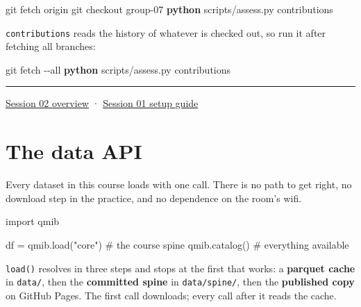 \documentclass[
  letterpaper,
  10pt,
  twoside,
  openright,
  numbers=noenddot,
  chapterprefix=true]{scrbook}
\newenvironment{Shaded}{}{}
\newcommand{\AttributeTok}[1]{\textcolor[rgb]{0.84,0.23,0.29}{#1}}
\newcommand{\CommentTok}[1]{\textcolor[rgb]{0.42,0.45,0.49}{#1}}
\newcommand{\ExtensionTok}[1]{\textcolor[rgb]{0.84,0.23,0.29}{\textbf{#1}}}
\newcommand{\FunctionTok}[1]{\textcolor[rgb]{0.44,0.26,0.76}{#1}}
\newcommand{\ImportTok}[1]{\textcolor[rgb]{0.01,0.18,0.38}{#1}}
\newcommand{\NormalTok}[1]{\textcolor[rgb]{0.14,0.16,0.18}{#1}}
\newcommand{\OperatorTok}[1]{\textcolor[rgb]{0.14,0.16,0.18}{#1}}
\newcommand{\StringTok}[1]{\textcolor[rgb]{0.01,0.18,0.38}{#1}}
\begin{document}
\begin{Shaded}
\begin{Highlighting}[]
\FunctionTok{git}\NormalTok{ fetch origin}
\FunctionTok{git}\NormalTok{ checkout group{-}07}
\ExtensionTok{python}\NormalTok{ scripts/assess.py contributions}
\end{Highlighting}
\end{Shaded}

\texttt{contributions} reads the history of whatever is checked out, so
run it after fetching all branches:

\begin{Shaded}
\begin{Highlighting}[]
\FunctionTok{git}\NormalTok{ fetch }\AttributeTok{{-}{-}all}
\ExtensionTok{python}\NormalTok{ scripts/assess.py contributions}
\end{Highlighting}
\end{Shaded}

\begin{center}\rule{0.5\linewidth}{0.5pt}\end{center}

\href{https://github.com/warint/quantitative-methods/blob/main/README.md}{Session
02 overview} · \hyperref[introduction]{Session 01 setup guide}

\chapter{The data API}\label{the-data-api}

Every dataset in this course loads with one call. There is no path to
get right, no download step in the practice, and no dependence on the
room's wifi.

\begin{Shaded}
\begin{Highlighting}[]
\ImportTok{import}\NormalTok{ qmib}

\NormalTok{df }\OperatorTok{=}\NormalTok{ qmib.load(}\StringTok{"core"}\NormalTok{)        }\CommentTok{\# the course spine}
\NormalTok{qmib.catalog()                }\CommentTok{\# everything available}
\end{Highlighting}
\end{Shaded}

\begin{qmibstep}

\texttt{load()} resolves in three steps and stops at the first that
works: a \textbf{parquet cache} in \texttt{data/}, then the
\textbf{committed spine} in \texttt{data/spine/}, then the
\textbf{published copy} on GitHub Pages. The first call downloads; every
call after it reads the cache.

\end{qmibstep}
\end{document}
